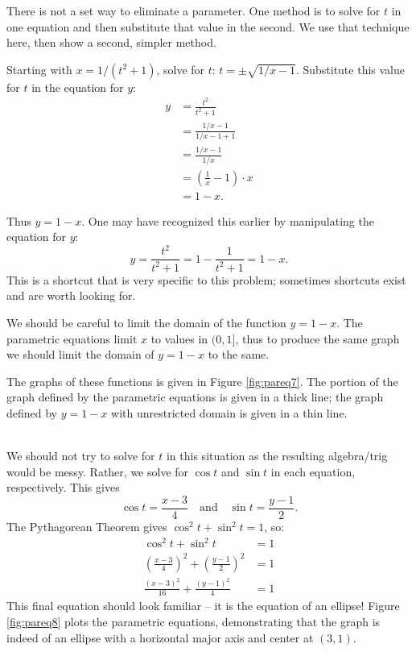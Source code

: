 {There is not a set way to eliminate a parameter. One method is to solve for $t$ in one equation and then substitute that value in the second. We use that technique here, then show a second, simpler method.

Starting with $x= 1/(t^2+1)$, solve for $t$: $ t = \pm\sqrt{1/x-1}$. Substitute this value for $t$ in the equation for $y$:
\begin{align*}
 y &= \frac{t^2}{t^2 +1} \\
		&= \frac{1/x-1}{1/x-1+1} \\
		&= \frac{1/x - 1}{1/x} \\
		&= \left(\frac1x-1\right)\cdot x \\
		&= 1-x.
\end{align*}

Thus $y=1-x$. One may have recognized this earlier by manipulating the equation for $y$:
\[
y = \frac{t^2}{t^2+1} = 1-\frac{1}{t^2+1} = 1-x.
\]
This is a shortcut that is very specific to this problem; sometimes shortcuts exist and are worth looking for.

We should be careful to limit the domain of the function $y=1-x$. The parametric equations limit $x$ to values in $(0,1]$, thus to produce the same graph we should limit the domain of $y=1-x$ to the same. 

The graphs of these functions is given in Figure \ref{fig:pareq7}. The portion of the graph defined by the parametric equations is given in a thick line; the graph defined by $y=1-x$ with unrestricted domain is given in a thin line.
}\\

{We should not try to solve for $t$ in this situation as the resulting algebra/trig would be messy. Rather, we solve for $\cos t$ and $\sin t$ in each equation, respectively. This gives 
\[
\cos t = \frac{x-3}{4} \quad \text{and}\quad \sin t=\frac{y-1}{2}.
\]
The Pythagorean Theorem gives $\cos^2t+\sin^2t=1$, so:
\begin{align*}
\cos^2t+\sin^2t &=1 \\
\left(\frac{x-3}{4}\right)^2 +\left(\frac{y-1}{2}\right)^2 &=1\\
\frac{(x-3)^2}{16}+\frac{(y-1)^2}{4} &=1
\end{align*}
This final equation should look familiar -- it is the equation of an ellipse! Figure \ref{fig:pareq8} plots the parametric equations, demonstrating that the graph is indeed of an ellipse with a horizontal major axis and center at $(3,1)$. 
}\\

